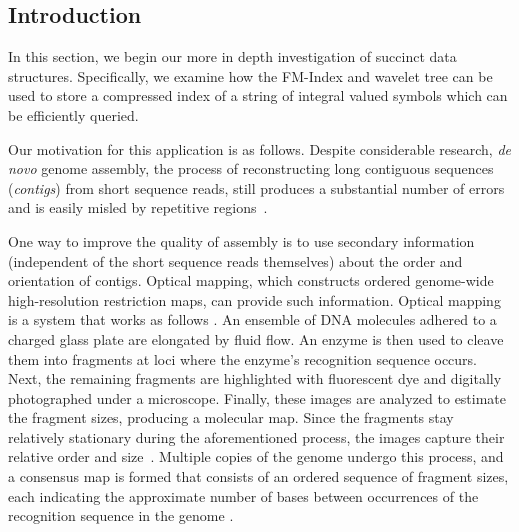 \subsection{Introduction}



In this section, we begin our more in depth investigation of succinct data structures.  Specifically, we examine how the FM-Index and wavelet tree can be used to store a compressed index of a string of integral valued symbols which can be efficiently queried. 

Our motivation for this application is as follows. Despite considerable research, \emph{de novo} genome assembly, the process of reconstructing long contiguous sequences (\emph{contigs}) from short sequence reads, still produces a substantial number of errors~\cite{sequel,Alkan:2011} and is easily misled by repetitive regions~\cite{salzberg}.

One way to improve the quality of assembly is to use secondary information (independent
of the short sequence reads themselves) about the order and orientation of contigs.   Optical mapping, which constructs ordered genome-wide high-resolution restriction maps, can provide such information. Optical mapping is a system that works as follows \cite{ORMenc,microfluidic}.  An ensemble of DNA molecules adhered to a charged glass plate are elongated by fluid flow.   An enzyme is then used to cleave them into fragments at loci where the enzyme's recognition sequence occurs. Next, the remaining fragments are highlighted with fluorescent dye and digitally photographed under a microscope. Finally, these images are analyzed to estimate the fragment sizes, producing a molecular map. Since the fragments stay relatively stationary during the aforementioned process, the images capture their relative order and size~\cite{Neely11}.   Multiple copies of the genome undergo this process, and a consensus map is formed that consists of an ordered sequence of fragment sizes, each indicating the approximate number of bases between occurrences of the recognition sequence in the genome \cite{Anantharaman01}.

